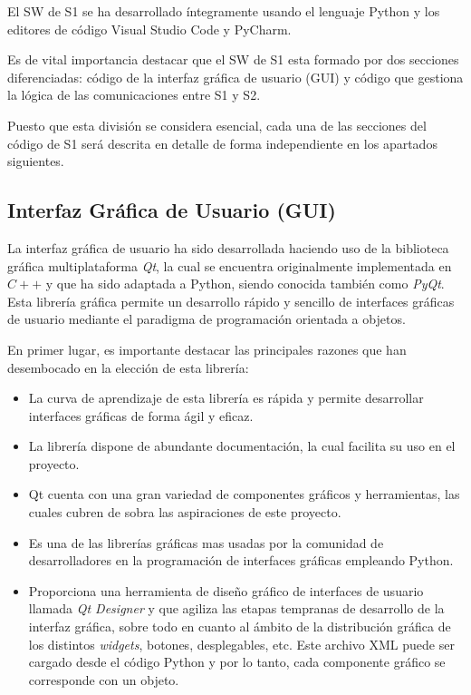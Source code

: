 El \ac{SW} de \ac{S1} se ha desarrollado íntegramente usando el lenguaje Python y los editores de código Visual Studio Code y PyCharm.

Es de vital importancia destacar que el \ac{SW} de \ac{S1} esta formado por dos secciones diferenciadas: código de la interfaz gráfica de usuario (GUI) y código que gestiona la lógica de las comunicaciones entre \ac{S1} y \ac{S2}.

Puesto que esta división se considera esencial, cada una de las secciones del código de \ac{S1} será descrita en detalle de forma independiente en los apartados siguientes.

\subsection{Interfaz Gráfica de Usuario (GUI)}

La interfaz gráfica de usuario ha sido desarrollada haciendo uso de la biblioteca gráfica multiplataforma \textit{Qt}, la cual se encuentra originalmente implementada en $C++$ y que ha sido adaptada a Python, siendo conocida también como \textit{PyQt}. Esta librería gráfica permite un desarrollo rápido y sencillo de interfaces gráficas de usuario mediante el paradigma de programación orientada a objetos.

En primer lugar, es importante destacar las principales razones que han desembocado en la elección de esta librería:
\begin{itemize}
    \item La curva de aprendizaje de esta librería es rápida y permite desarrollar interfaces gráficas de forma ágil y eficaz.
    \item La librería dispone de abundante documentación, la cual facilita su uso en el proyecto.
    \item Qt cuenta con una gran variedad de componentes gráficos y herramientas, las cuales cubren de sobra las aspiraciones de este proyecto.
    \item Es una de las librerías gráficas mas usadas por la comunidad de desarrolladores en la programación de interfaces gráficas empleando Python.
    \item Proporciona una herramienta de diseño gráfico de interfaces de usuario llamada \textit{Qt Designer} y que agiliza las etapas tempranas de desarrollo de la interfaz gráfica, sobre todo en cuanto al ámbito de la distribución gráfica de los distintos \textit{widgets}, botones, desplegables, etc. Este archivo XML puede ser cargado desde el código Python y por lo tanto, cada componente gráfico se corresponde con un objeto.
\end{itemize}

